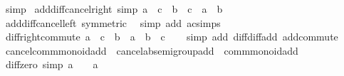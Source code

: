 \begin{isabellebody}
\ simp%
\endisatagproof
{\isafoldproof}%
%
\isadelimproof
\isanewline
%
\endisadelimproof
\isanewline
{}\isamarkupfalse%
\ add{\isacharunderscore}{\kern0pt}diff{\isacharunderscore}{\kern0pt}cancel{\isacharunderscore}{\kern0pt}right\ {\isacharbrackleft}{\kern0pt}simp{\isacharbrackright}{\kern0pt}{\isacharcolon}{\kern0pt}\ {\isachardoublequoteopen}{\isacharparenleft}{\kern0pt}a\ {\isacharplus}{\kern0pt}\ c{\isacharparenright}{\kern0pt}\ {\isacharminus}{\kern0pt}\ {\isacharparenleft}{\kern0pt}b\ {\isacharplus}{\kern0pt}\ c{\isacharparenright}{\kern0pt}\ {\isacharequal}{\kern0pt}\ a\ {\isacharminus}{\kern0pt}\ b{\isachardoublequoteclose}\isanewline
%
\isadelimproof
\ \ %
\endisadelimproof
%
\isatagproof
{}\isamarkupfalse%
\ add{\isacharunderscore}{\kern0pt}diff{\isacharunderscore}{\kern0pt}cancel{\isacharunderscore}{\kern0pt}left\ {\isacharbrackleft}{\kern0pt}symmetric{\isacharbrackright}{\kern0pt}\ \isamarkupfalse%
\ {\isacharparenleft}{\kern0pt}simp\ add{\isacharcolon}{\kern0pt}\ ac{\isacharunderscore}{\kern0pt}simps{\isacharparenright}{\kern0pt}%
\endisatagproof
{\isafoldproof}%
%
\isadelimproof
\isanewline
%
\endisadelimproof
\isanewline
{}\isamarkupfalse%
\ diff{\isacharunderscore}{\kern0pt}right{\isacharunderscore}{\kern0pt}commute{\isacharcolon}{\kern0pt}\ {\isachardoublequoteopen}a\ {\isacharminus}{\kern0pt}\ c\ {\isacharminus}{\kern0pt}\ b\ {\isacharequal}{\kern0pt}\ a\ {\isacharminus}{\kern0pt}\ b\ {\isacharminus}{\kern0pt}\ c{\isachardoublequoteclose}\isanewline
%
\isadelimproof
\ \ %
\endisadelimproof
%
\isatagproof
{}\isamarkupfalse%
\ {\isacharparenleft}{\kern0pt}simp\ add{\isacharcolon}{\kern0pt}\ diff{\isacharunderscore}{\kern0pt}diff{\isacharunderscore}{\kern0pt}add\ add{\isachardot}{\kern0pt}commute{\isacharparenright}{\kern0pt}%
\endisatagproof
{\isafoldproof}%
%
\isadelimproof
\isanewline
%
\endisadelimproof
\isanewline
{}\isamarkupfalse%
\isanewline
\isanewline
{}\isamarkupfalse%
\ cancel{\isacharunderscore}{\kern0pt}comm{\isacharunderscore}{\kern0pt}monoid{\isacharunderscore}{\kern0pt}add\ {\isacharequal}{\kern0pt}\ cancel{\isacharunderscore}{\kern0pt}ab{\isacharunderscore}{\kern0pt}semigroup{\isacharunderscore}{\kern0pt}add\ {\isacharplus}{\kern0pt}\ comm{\isacharunderscore}{\kern0pt}monoid{\isacharunderscore}{\kern0pt}add\isanewline
{}\isanewline
\isanewline
{}\isamarkupfalse%
\ diff{\isacharunderscore}{\kern0pt}zero\ {\isacharbrackleft}{\kern0pt}simp{\isacharbrackright}{\kern0pt}{\isacharcolon}{\kern0pt}\ {\isachardoublequoteopen}a\ {\isacharminus}{\kern0pt}\ {}\ {\isacharequal}{\kern0pt}\ a{\isachardoublequoteclose}\isanewline

\end{isabellebody}
